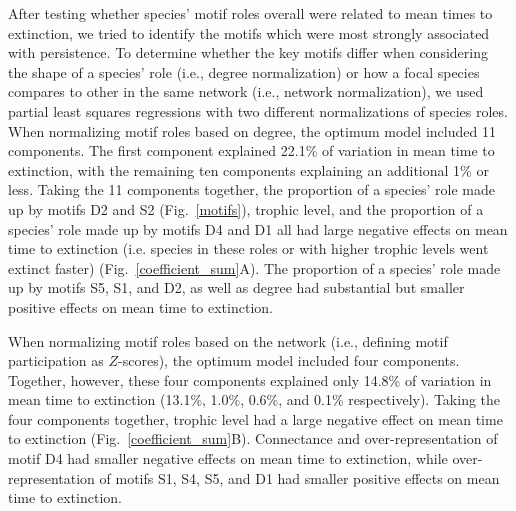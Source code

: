 \documentclass[12pt]{article}
\begin{document}
        After testing whether species' motif roles overall were related to mean times to extinction, we tried to identify the motifs which were most strongly associated with persistence. 
        To determine whether the key motifs differ when considering the shape of a species' role (i.e., degree normalization) or how a focal species compares to other in the same network (i.e., network normalization), we used partial least squares regressions with two different normalizations of species roles.
		When normalizing motif roles based on degree, the optimum model included 11 components.
		The first component explained 22.1\% of variation in mean time to extinction, with the remaining ten components explaining an additional 1\% or less.
		Taking the 11 components together, the proportion of a species' role made up by motifs D2 and S2 (Fig.~\ref{motifs}), trophic level, and the proportion of a species' role made up by motifs D4 and D1 all had large negative effects on mean time to extinction (i.e. species in these roles or with higher trophic levels went extinct faster) (Fig.~\ref{coefficient_sum}A).
		The proportion of a species' role made up by motifs S5, S1, and D2, as well as degree had substantial but smaller positive effects on mean time to extinction.


		When normalizing motif roles based on the network (i.e., defining motif participation as $Z$-scores), the optimum model included four components.
		Together, however, these four components explained only 14.8\% of variation in mean time to extinction (13.1\%, 1.0\%, 0.6\%, and 0.1\% respectively).
		Taking the four components together, trophic level had a large negative effect on mean time to extinction (Fig.~\ref{coefficient_sum}B).
		Connectance and over-representation of motif D4 had smaller negative effects on mean time to extinction, while over-representation of motifs S1, S4, S5, and D1 had smaller positive effects on mean time to extinction.
\end{document}
